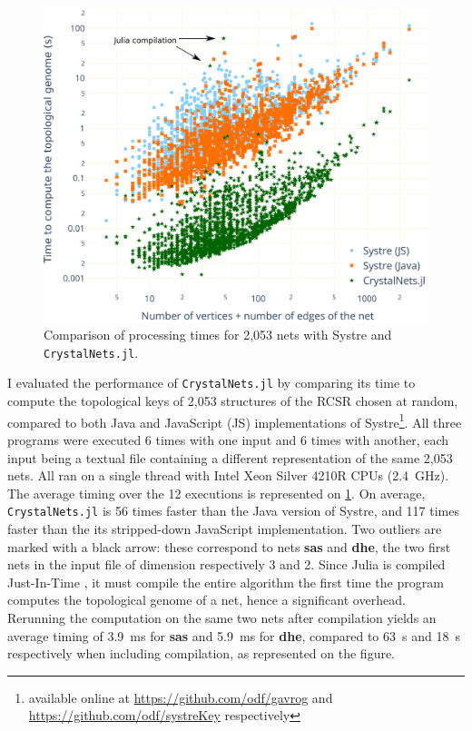 \documentclass[main.tex]{subfiles}
\begin{document}
\begin{figure}[t]
	\centering
	\includegraphics[width=\linewidth]{figures/topology/timings.pdf}
	\caption{\small Comparison of processing times for 2,053 nets with Systre and \texttt{CrystalNets.jl}.}
	\label{timings}
\end{figure}

I evaluated the performance of \texttt{CrystalNets.jl} by comparing its time to compute the topological keys of 2,053 structures of the RCSR chosen at random, compared to both Java and JavaScript (JS) implementations of Systre\footnote{available online at \url{https://github.com/odf/gavrog} and \url{https://github.com/odf/systreKey} respectively}. All three programs were executed 6 times with one input and 6 times with another, each input being a textual file containing a different representation of the same 2,053 nets. All ran on a single thread with Intel Xeon Silver 4210R CPUs (2.4~GHz). The average timing over the 12 executions is represented on \cref{timings}. On average, \texttt{CrystalNets.jl} is 56 times faster than the Java version of Systre, and 117 times faster than the its stripped-down JavaScript implementation. Two outliers are marked with a black arrow: these correspond to nets {\bf sas} and {\bf dhe}, the two first nets in the input file of dimension respectively 3 and 2. Since Julia is compiled Just-In-Time \autocite{JuliaDesign}, it must compile the entire algorithm the first time the program computes the topological genome of a net, hence a significant overhead. Rerunning the computation on the same two nets after compilation yields an average timing of \SI{3.9}{ms} for {\bf sas} and \SI{5.9}{ms} for {\bf dhe}, compared to \SI{63}{s} and \SI{18}{s} respectively when including compilation, as represented on the figure.
\end{document}
